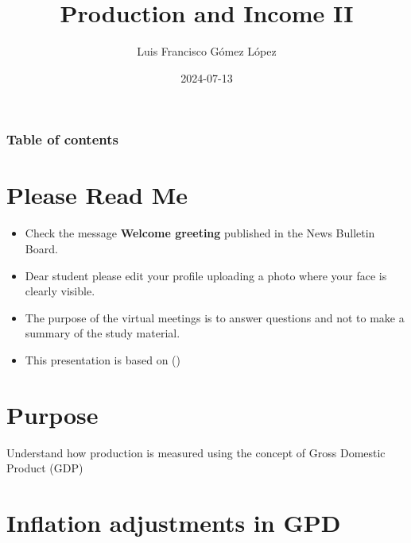 \documentclass[
  ignorenonframetext,
]{beamer}
\title{Production and Income II}
\author{Luis Francisco Gómez López}
\date{2024-07-13}
\institute{FAEDIS}
\renewcommand*\contentsname{Table of contents}
\newcommand\contentsname{Table of contents}
\begin{document}
\frame{\titlepage}

\renewcommand*\contentsname{Table of contents}
\begin{frame}[allowframebreaks]
  \frametitle{Table of contents}
  \tableofcontents[hideallsubsections]
\end{frame}

\section{Please Read Me}\label{please-read-me}

\begin{frame}{}
\label{section}
\begin{itemize}
\item
  Check the message \textbf{Welcome greeting} published in the News
  Bulletin Board.
\item
  Dear student please edit your profile uploading a photo where your
  face is clearly visible.
\item
  The purpose of the virtual meetings is to answer questions and not to
  make a summary of the study material.
\item
  This presentation is based on
  ()
\end{itemize}
\end{frame}

\section{Purpose}\label{purpose}

\begin{frame}{}
\label{section-1}
Understand how production is measured using the concept of Gross
Domestic Product (GDP)
\end{frame}

\section{Inflation adjustments in
GPD}\label{inflation-adjustments-in-gpd}
\end{document}
